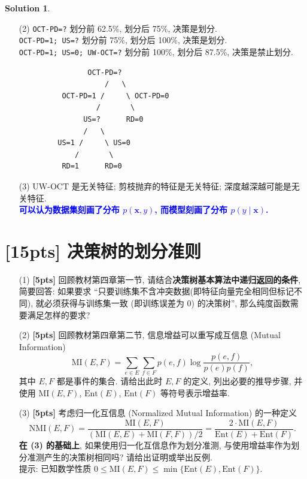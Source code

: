 \documentclass[a4paper]{article}
\numberwithin{equation}{section}
\theoremstyle{definition}
\newtheorem*{solution}{Solution}
\def \x {\bm{x}}
\newcommand\sbr[1]{\left( #1 \right)}
\begin{document}
\begin{solution}
\begin{itemize}
        \item[(2)] \texttt{OCT-PD=?} 划分前 62.5\%, 划分后 75\%, 决策是划分. \\
              \texttt{OCT-PD=1; US=?} 划分前 75\%, 划分后 100\%, 决策是划分. \\
              \texttt{OCT-PD=1; US=0; UW-OCT=?} 划分前 100\%, 划分后 87.5\%, 决策是禁止划分.
              \begin{lstlisting}
                OCT-PD=?
                    /   \
          OCT-PD=1 /     \ OCT-PD=0
                  /       \
               US=?      RD=0
               /   \
         US=1 /     \ US=0
             /       \
          RD=1      RD=0
             \end{lstlisting}
        \item[(3)] UW-OCT 是无关特征; 剪枝抛弃的特征是无关特征; 深度越深越可能是无关特征. \\
              \textcolor{blue}{\textbf{可以认为数据集刻画了分布 $p(\x, y)$, 而模型刻画了分布 $p(y \mid \x)$.}}
    \end{itemize}
\end{solution}

\newpage

\section{[15pts] 决策树的划分准则}

\begin{enumerate}
    \item[(1)] \textbf{[5pts]} 回顾教材第四章第一节, 请结合\textbf{决策树基本算法中递归返回的条件}, 简要回答: 如果要求 ``只要训练集不含冲突数据(即特征向量完全相同但标记不同), 就必须获得与训练集一致 (即训练误差为 $0$) 的决策树'', 那么纯度函数需要满足怎样的要求?
    \item[(2)] \textbf{[5pts]} 回顾教材第四章第二节, 信息增益可以重写成互信息 (Mutual Information)
          $$\mathrm{MI}(E,F) = \sum_{e \in E} \sum_{f \in F} p(e,f) \log \frac{p(e,f)}{p(e)p(f)},$$
          其中 $E,F$ 都是事件的集合. 请给出此时 $E,F$ 的定义, 列出必要的推导步骤, 并使用 $\mathrm{MI}(E,F)$, $\mathrm{Ent}(E)$, $\mathrm{Ent}(F)$ 等符号表示增益率.
    \item[(3)] \textbf{[5pts]} 考虑归一化互信息 (Normalized Mutual Information) 的一种定义
          $$\mathrm{NMI}(E,F) = \frac{\mathrm{MI}(E,F)}{\sbr{\mathrm{MI}(E,E) + \mathrm{MI}(F,F)} / 2} = \frac{2 \cdot \mathrm{MI}(E,F)}{\mathrm{Ent}(E) + \mathrm{Ent}(F)}.$$
          \textbf{在 (3) 的基础上}, 如果使用归一化互信息作为划分准测, 与使用增益率作为划分准测产生的决策树相同吗? 请给出证明或举出反例. \\
          提示: 已知数学性质 $0 \leqslant \mathrm{MI}(E,F) \leqslant \min\{\mathrm{Ent}(E), \mathrm{Ent}(F)\}$.
\end{enumerate}
\end{document}

